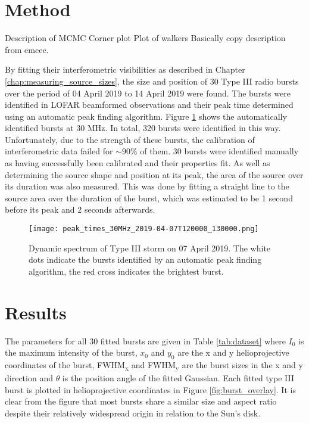 \section{Method}
\label{sec:obsvtheory_method}
Description of MCMC
Corner plot Plot of walkers
Basically copy description from emcee.


By fitting their interferometric visibilities as described in Chapter \ref{chap:measuring_source_sizes}, the size and position of 30 Type III radio bursts over the period of 04 April 2019 to 14 April 2019 were found. The bursts were identified in LOFAR beamformed observations and their peak time determined using an automatic peak finding algorithm. Figure \ref{fig:dynamic_spectrum_070419} shows the automatically identified bursts at 30 MHz. In total, 320 bursts were identified in this way. Unfortunately, due to the strength of these bursts, the calibration of interferometric data failed for $\sim 90 \%$ of them. 30 bursts were identified manually as having successfully been calibrated and their properties fit. As well as determining the source shape and position at its peak, the area of the source over its duration was also measured. This was done by fitting a straight line to the source area over the duration of the burst, which was estimated to be 1 second before its peak and 2 seconds afterwards.

\begin{figure}[ht]
\centering
\texttt{[image: peak\_times\_30MHz\_2019-04-07T120000\_130000.png]}
\caption[Dynamic spectrum of Type III storm on 07 April 2019.]{Dynamic spectrum of Type III storm on 07 April 2019. The white dots indicate the bursts identified by an automatic peak finding algorithm, the red cross indicates the brightest burst.}
\label{fig:dynamic_spectrum_070419}
\end{figure}

\section{Results}
\label{sec:obsvtheory_results}
The parameters for all 30 fitted bursts are given in Table \ref{tab:dataset} where $I_0$ is the maximum intensity of the burst, $x_0$ and $y_0$ are the x and y  helioprojective coordinates of the burst, FWHM\textsubscript{x} and FWHM\textsubscript{y} are the burst sizes in the x and y direction and $\theta$ is the position angle of the fitted Gaussian. Each fitted type III burst is plotted in helioprojective coordinates in Figure \ref{fig:burst_overlay}. It is clear from the figure that most bursts share a similar size and aspect ratio despite their relatively widespread origin in relation to the Sun's disk.

